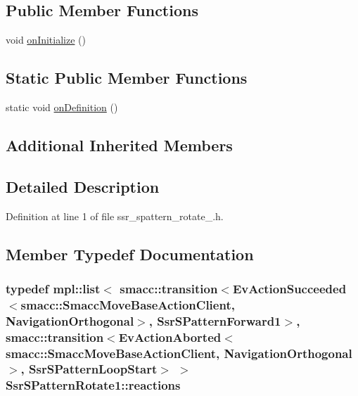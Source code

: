 \subsection*{Public Member Functions}
\begin{DoxyCompactItemize}
\item 
void \hyperlink{structSsrSPatternRotate1_a8e3038ccd3fd6007ea7614ba703b7948}{on\+Initialize} ()
\end{DoxyCompactItemize}
\subsection*{Static Public Member Functions}
\begin{DoxyCompactItemize}
\item 
static void \hyperlink{structSsrSPatternRotate1_aa1ceb73aab8fe995f57e02b9edec44a8}{on\+Definition} ()
\end{DoxyCompactItemize}
\subsection*{Additional Inherited Members}


\subsection{Detailed Description}


Definition at line 1 of file ssr\+\_\+spattern\+\_\+rotate\+\_.\+h.



\subsection{Member Typedef Documentation}
\subsubsection[{\texorpdfstring{reactions}{reactions}}]{\setlength{\rightskip}{0pt plus 5cm}typedef mpl\+::list$<$ {\bf smacc\+::transition}$<$Ev\+Action\+Succeeded$<${\bf smacc\+::\+Smacc\+Move\+Base\+Action\+Client}, {\bf Navigation\+Orthogonal}$>$, {\bf Ssr\+S\+Pattern\+Forward1}$>$, {\bf smacc\+::transition}$<$Ev\+Action\+Aborted$<${\bf smacc\+::\+Smacc\+Move\+Base\+Action\+Client}, {\bf Navigation\+Orthogonal}$>$, {\bf Ssr\+S\+Pattern\+Loop\+Start}$>$ $>$ {\bf Ssr\+S\+Pattern\+Rotate1\+::reactions}}\hypertarget{structSsrSPatternRotate1_acdca1a29e072ed254ca12d3c2056368a}{}\label{structSsrSPatternRotate1_acdca1a29e072ed254ca12d3c2056368a}


